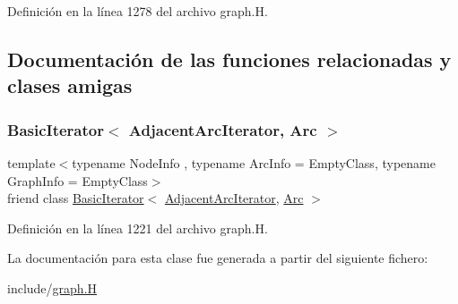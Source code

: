 Definición en la línea 1278 del archivo graph.\+H.



\subsection{Documentación de las funciones relacionadas y clases amigas}
\mbox{\label{class_designar_1_1_graph_1_1_adjacent_arc_iterator_a73ad70d76f3331ee4b07451db1347918}} 
\subsubsection{\texorpdfstring{Basic\+Iterator$<$ Adjacent\+Arc\+Iterator, Arc $>$}{BasicIterator< AdjacentArcIterator, Arc >}}
{\footnotesize\ttfamily template$<$typename Node\+Info , typename Arc\+Info  = Empty\+Class, typename Graph\+Info  = Empty\+Class$>$ \\
friend class \hyperlink{class_designar_1_1_basic_iterator}{Basic\+Iterator}$<$ \hyperlink{class_designar_1_1_graph_1_1_adjacent_arc_iterator}{Adjacent\+Arc\+Iterator}, \hyperlink{class_designar_1_1_graph_a74c730ef4ce2d20f998d72bd25c2b5bf}{Arc} $>$\hspace{0.3cm}{\ttfamily [friend]}}



Definición en la línea 1221 del archivo graph.\+H.



La documentación para esta clase fue generada a partir del siguiente fichero\+:\begin{DoxyCompactItemize}
\item 
include/\hyperlink{graph_8_h}{graph.\+H}\end{DoxyCompactItemize}
